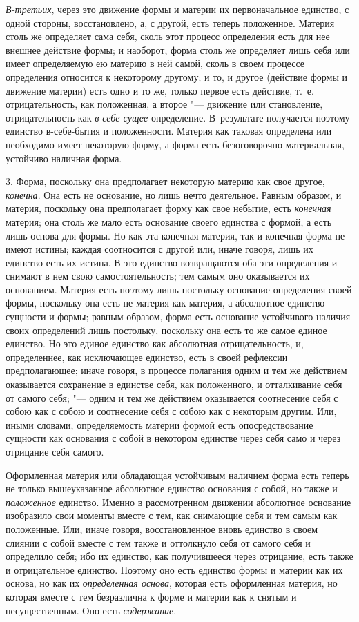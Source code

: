 {\em В-третьих}, через это движение формы и материи их
первоначальное единство, с одной стороны, восстановлено, а, с другой, есть
теперь положенное. Материя столь же определяет сама себя, сколь этот
процесс определения есть для нее внешнее действие формы; и наоборот, форма
столь же определяет лишь себя или имеет определяемую ею материю в ней
самой, сколь в своем процессе определения относится к некоторому другому; и
то, и другое (действие формы и движение материи) есть одно и то же, только
первое есть действие, т.~е. отрицательность, как положенная, а второе
"--- движение или становление, отрицательность как
{\em в-себе-сущее} определение. В~результате получается
поэтому единство в-себе-бытия и положенности. Материя как таковая
определена или необходимо имеет некоторую форму, а форма есть безоговорочно
материальная, устойчиво наличная форма.

3. Форма, поскольку она предполагает некоторую материю как свое другое,
{\em конечна}. Она есть не основание, но лишь нечто
деятельное. Равным образом, и материя, поскольку она предполагает форму как
свое небытие, есть {\em конечная} материя; она столь же
мало есть основание своего единства с формой, а есть лишь основа для формы.
Но как эта конечная материя, так и конечная форма не имеют истины; каждая
соотносится с другой или, иначе говоря, лишь их единство есть их истина. В
это единство возвращаются оба эти определения и снимают в нем свою
самостоятельность; тем самым оно оказывается их основанием. Материя есть
поэтому лишь постольку основание определения своей формы, поскольку она
есть не материя как материя, а абсолютное единство сущности и формы; равным
образом, форма есть основание устойчивого наличия своих определений лишь
постольку, поскольку она есть то же самое единое единство. Но это единое
единство как абсолютная отрицательность, и, определеннее, как исключающее
единство, есть в своей рефлексии предполагающее; иначе говоря, в процессе
полагания одним и тем же действием оказывается сохранение в единстве себя,
как положенного, и отталкивание себя от самого себя; "--- одним и тем же
действием оказывается соотнесение себя с собою как с собою и соотнесение
себя с собою как с некоторым другим. Или, иными словами, определяемость
материи формой есть опосредствование сущности как основания с собой в
некотором единстве через себя само и через отрицание себя самого.

Оформленная материя или обладающая устойчивым наличием форма есть теперь не
только вышеуказанное абсолютное единство основания с собой, но также и
{\em положенное} единство. Именно в рассмотренном
движении абсолютное основание изобразило свои моменты вместе с тем, как
снимающие себя и тем самым как положенные. Или, иначе говоря,
восстановленное вновь единство в своем слиянии с собой вместе с тем также и
оттолкнуло себя от самого себя и определило себя; ибо их единство, как
получившееся через отрицание, есть также и отрицательное единство. Поэтому
оно есть единство формы и материи как их основа, но как их
{\em определенная основа}, которая есть оформленная
материя, но которая вместе с тем безразлична к форме и материи как к снятым
и несущественным. Оно есть {\em содержание}.

